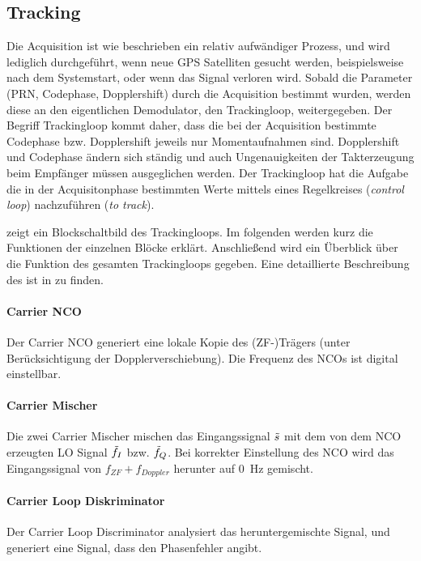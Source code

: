\subsection{Tracking}
Die Acquisition ist wie beschrieben ein relativ aufwändiger Prozess, und wird lediglich durchgeführt, wenn neue GPS Satelliten gesucht werden, beispielsweise nach dem Systemstart, oder wenn das Signal verloren wird. Sobald die Parameter (PRN, Codephase, Dopplershift) durch die Acquisition bestimmt wurden, werden diese an den eigentlichen Demodulator, den Trackingloop, weitergegeben. Der Begriff Trackingloop kommt daher, dass die bei der Acquisition bestimmte Codephase bzw. Dopplershift jeweils nur Momentaufnahmen sind. Dopplershift und Codephase ändern sich ständig und auch Ungenauigkeiten der Takterzeugung beim Empfänger müssen ausgeglichen werden. Der Trackingloop hat die Aufgabe die in der Acquisitonphase bestimmten Werte mittels eines Regelkreises (\emph{control loop}) nachzuführen (\emph{to track}). 


 zeigt ein Blockschaltbild des Trackingloops. Im folgenden werden kurz die Funktionen der einzelnen Blöcke erklärt. Anschließend wird ein Überblick über die Funktion des gesamten Trackingloops gegeben. Eine detaillierte Beschreibung des ist in \cite{borre2007software} zu finden.

\paragraph{Carrier NCO} Der Carrier \gls{NCO} generiert eine lokale Kopie des (ZF-)Trägers (unter Berücksichtigung der Dopplerverschiebung). Die Frequenz des NCOs ist digital einstellbar.

\paragraph{Carrier Mischer} Die zwei Carrier Mischer mischen das Eingangssignal $\tilde{s}$ mit dem von dem NCO erzeugten LO Signal $\tilde{f}_I$ bzw. $\tilde{f}_Q$. Bei korrekter Einstellung des NCO wird das Eingangssignal von  $f_{ZF}+f_{Doppler}$ herunter auf \SI{0}{\Hz} gemischt.

\paragraph{Carrier Loop Diskriminator} Der Carrier Loop Discriminator analysiert das heruntergemischte Signal, und generiert eine Signal, dass den Phasenfehler angibt.

